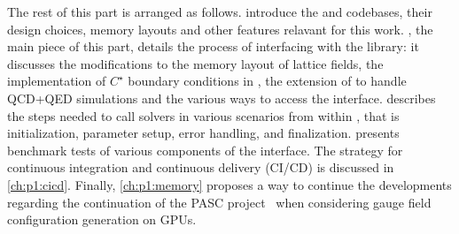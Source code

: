 

The rest of this part is arranged as follows.
 introduce the \openqxd and \quda codebases, their design choices, memory layouts and other features relavant for this work.
, the main piece of this part, details the process of interfacing \openqxd with the \quda library: it discusses the modifications to the memory layout of lattice fields, the implementation of $C^\star$ boundary conditions in \quda, the extension of \quda to handle QCD+QED simulations and the various ways to access the interface.
 describes the steps needed to call \quda solvers in various scenarios from within \openqxd, that is initialization, parameter setup, error handling, and finalization.
 presents benchmark tests of various components of the interface.
The strategy for continuous integration and continuous delivery (CI/CD) is discussed in \cref{ch:p1:cicd}.
Finally, \cref{ch:p1:memory} proposes a way to continue the developments regarding the continuation of the PASC project~\cite{online:pasc2025} when considering gauge field configuration generation on GPUs.

